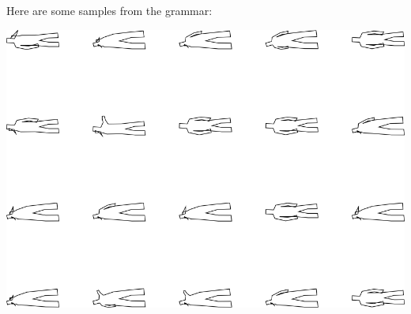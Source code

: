 Here are some samples from the grammar:

\includegraphics[width=6in]{output/3.learning/incremental/gram.5.d/samples.png}

